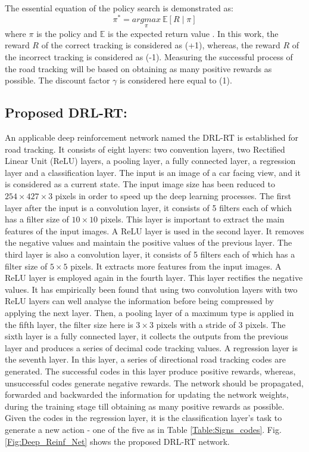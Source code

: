 \documentclass[conference]{IEEEtran}
\begin{document}
		The essential equation of the policy search is demonstrated as:
		\begin{equation}
			\pi^*=\underset{\pi}{argmax}~\mathbb{E} [R\mid\pi]
			\label{Eq:MDP}
		\end{equation}
		where $\pi$ is the policy and $\mathbb{E}$ is the expected return value \cite{arulkumaran2017brief}. In this work, the reward $R$ of the correct tracking is considered as (+1), whereas, the reward $R$ of the incorrect tracking is considered as (-1). Measuring the successful process of the road tracking will be based on obtaining as many positive rewards as possible. The discount factor $\gamma$ is considered here equal to (1).
		
	\subsection{Proposed DRL-RT:} 
		An applicable deep reinforcement network named the DRL-RT is established for road tracking. It consists of eight layers: two convention layers, two Rectified Linear Unit (ReLU) layers, a pooling layer, a fully connected layer, a regression layer and a classification layer. The input is an image of a car facing view, and it is considered as a current state. The input image size has been reduced to $254 \times 427 \times 3$ pixels in order to speed up the deep learning processes. The first layer after the input is a convolution layer, it consists of 5 filters each of which has a filter size of $10 \times 10$ pixels. This layer is important to extract the main features of the input images. A ReLU layer is used in the second layer. It removes the negative values and maintain the positive values of the previous layer. The third layer is also a convolution layer, it consists of 5 filters each of which has a filter size of $5 \times 5$ pixels. It extracts more features from the input images. A ReLU layer is employed again in the fourth layer. This layer rectifies the negative values. It has empirically been found that using two convolution layers with two ReLU layers can well analyse the information before being compressed by applying the next layer. Then, a pooling layer of a maximum type is applied in the fifth layer, the filter size here is $3 \times 3$ pixels with a stride of 3 pixels. The sixth layer is a fully connected layer, it collects the outputs from the previous layer and produces a series of decimal code tracking values. A regression layer is the seventh layer. In this layer, a series of directional road tracking codes are generated. The successful codes in this layer produce positive rewards, whereas, unsuccessful codes generate negative rewards. The network should be propagated, forwarded and backwarded the information for updating the network weights, during the training stage till obtaining as many positive rewards as possible. Given the codes in the regression layer, it is the classification layer's task to generate a new action - one of the five as in Table \ref{Table:Signs_codes}. Fig. \ref{Fig:Deep_Reinf_Net} shows the proposed DRL-RT network.
	
\end{document}
